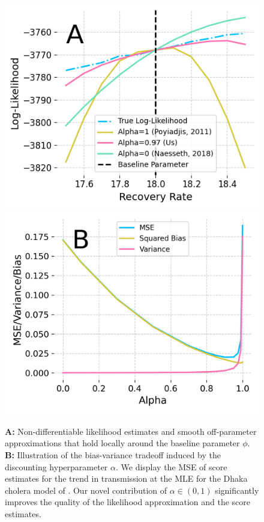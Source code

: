 \documentclass[numsec,webpdf,modern,medium,namedate]{oup-authoring-template}
\newcommand\arxiv[2]{#2} %
\theoremstyle{thmstyleone}%
\theoremstyle{thmstyletwo}%
\theoremstyle{thmstylethree}%
\begin{document}
\begin{figure}[htbp!]
  \centering
  
    \arxiv{}{\vspace*{0.15ex}}
    \includegraphics[width=\arxiv{10cm}{\textwidth/\real{2.2}}]{imgs/095/mop.png}
    \includegraphics[width=\arxiv{10cm}{\textwidth/\real{2.21}}]{imgs/095/biasvar.png}
    \arxiv{}{\vspace*{-2ex}}
    \caption{\textbf{A:} Non‐differentiable likelihood estimates and smooth off‐parameter approximations that hold locally around the baseline parameter $\phi$. \textbf{B:} Illustration of the bias-variance tradeoff induced by the discounting hyperparameter $\alpha$. We display the MSE of score estimates for the trend in transmission at the MLE for the Dhaka cholera model of \cite{king08}. Our novel contribution of $\alpha \in (0,1)$ significantly improves the quality of the likelihood approximation and the score estimates.}
    \label{fig:biasvar}
    \arxiv{}{\vspace*{-2ex}}
\end{figure}
\end{document}

